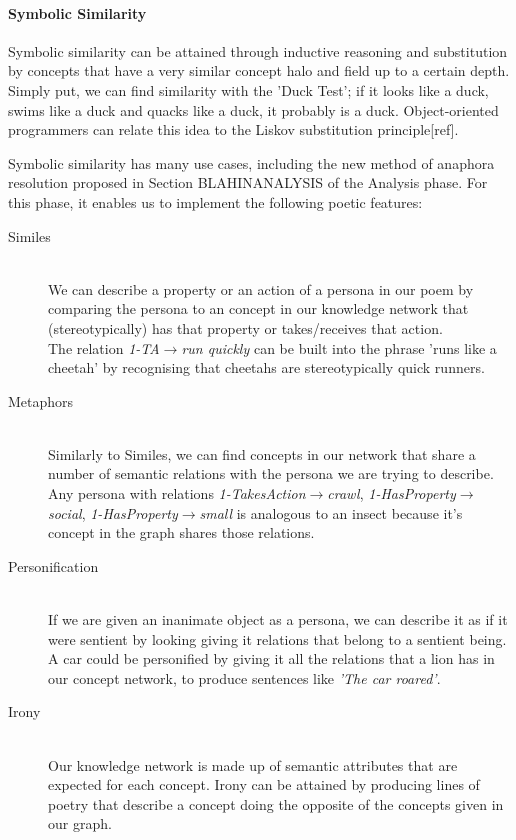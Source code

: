 \paragraph{Symbolic Similarity}
Symbolic similarity can be attained through inductive reasoning and substitution by concepts that have a very similar concept halo and field up to a certain depth. Simply put, we can find similarity with the 'Duck Test'; if it looks like a duck, swims like a duck and quacks like a duck, it probably is a duck. Object-oriented programmers can relate this idea to the Liskov substitution principle[ref].

Symbolic similarity has many use cases, including the new method of anaphora resolution proposed in Section BLAHINANALYSIS of the Analysis phase. For this phase, it enables us to implement the following poetic features:
\begin{description}
\item[Similes] \hfill \\ We can describe a property or an action of a persona in our poem by comparing the persona to an concept in our knowledge network that (stereotypically) has that property or takes/receives that action. \hfill \\ The relation \textit{1-TA$\rightarrow$run quickly} can be built into the phrase 'runs like a cheetah' by recognising that cheetahs are stereotypically quick runners.
\item[Metaphors] \hfill \\ Similarly to Similes, we can find concepts in our network that share a number of semantic relations with the persona we are trying to describe. \hfill \\ Any persona with relations \textit{1-TakesAction$\rightarrow$crawl}, \textit{1-HasProperty$\rightarrow$social}, \textit{1-HasProperty$\rightarrow$small} is analogous to an insect because it's concept in the graph shares those relations.
\item[Personification] \hfill \\ If we are given an inanimate object as a persona, we can describe it as if it were sentient by looking giving it relations that belong to a sentient being. \hfill \\ A car could be personified by giving it all the relations that a lion has in our concept network, to produce sentences like \textit{'The car roared'}.
\item[Irony] \hfill \\ Our knowledge network is made up of semantic attributes that are expected for each concept. Irony can be attained by producing lines of poetry that describe a concept doing the opposite of the concepts given in our graph.
\end{description} 


